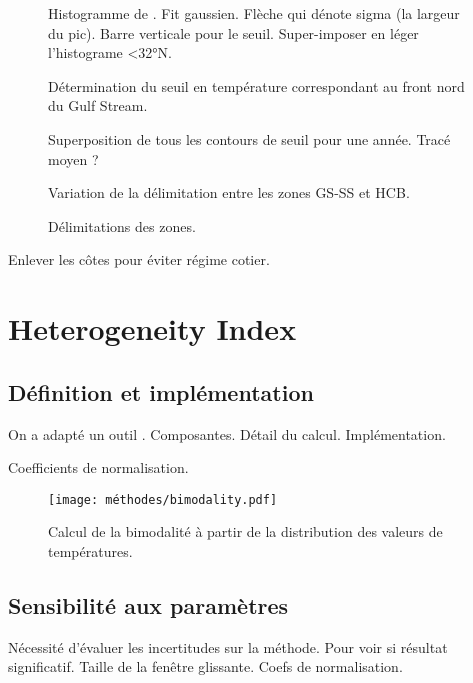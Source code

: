 \documentclass[index]{subfiles}
\begin{document}
\begin{figure}
  Histogramme de . Fit gaussien. Flèche qui dénote sigma (la largeur du pic).
  Barre verticale pour le seuil.
  Super-imposer en léger l'histograme <32°N.
  \caption{Détermination du seuil en température correspondant au front nord du Gulf Stream.}
  \label{fig:seuil-temp}
\end{figure}


\begin{figure}
  Superposition de tous les contours de seuil pour une année.
  Tracé moyen ?
  \caption{Variation de la délimitation entre les zones GS-SS et HCB.}
  \label{fig:var-delim}
\end{figure}


\begin{figure}
  \caption{Délimitations des zones.}
  \label{fig:zone-delimitation}
\end{figure}

Enlever les côtes pour éviter régime cotier.

\section{Heterogeneity Index}
\label{sec:HI}

\subsection{Définition et implémentation}
\label{sec:HI-definition}

On a adapté un outil \parencite{liu_2016}.
Composantes.
Détail du calcul.
Implémentation.

Coefficients de normalisation.

\begin{figure}
  \centering
  \texttt{[image: méthodes/bimodality.pdf]}
  \caption[Calcul de la bimodalité]{Calcul de la bimodalité à partir de la distribution des valeurs de températures.}
  \label{fig:bimodality}
\end{figure}

\subsection{Sensibilité aux paramètres}
\label{sec:HI-sensibilite}

Nécessité d'évaluer les incertitudes sur la méthode.
Pour voir si résultat significatif.
Taille de la fenêtre glissante. Coefs de normalisation.
\end{document}

